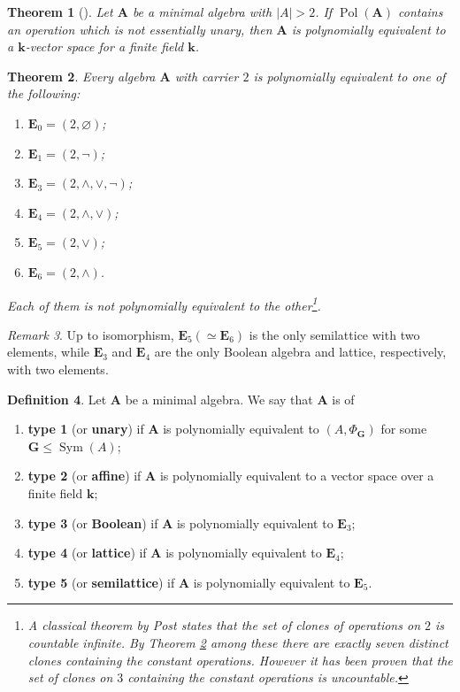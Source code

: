 \documentclass{amsart}
\theoremstyle{plain}
\newtheorem{theorem}{Theorem}[section]
\theoremstyle{definition}
\newtheorem{definition}[theorem]{Definition}
\theoremstyle{remark}
\newtheorem{remark}[theorem]{Remark}
\DeclareMathOperator{\Pol}{Pol}
\DeclareMathOperator{\Sym}{Sym}
\begin{document}
\begin{theorem}
    [\cite{classification-minimal}]
    Let $\mathbf{A}$ be a minimal algebra with $|A| > 2$.  
    If $\Pol(\mathbf{A})$ contains an operation which is not essentially unary, then $\mathbf{A}$ is polynomially equivalent to a $\mathbf{k}$-vector space for a finite field $\mathbf{k}$. 
\end{theorem}

\begin{theorem}
    \label{classification-two}
    Every algebra $\mathbf{A}$ with carrier $2$ is polynomially equivalent to one of the following: 
    \begin{enumerate}
        \item $\mathbf{E}_0= (2, \varnothing)$;
        \item $\mathbf{E}_1 = (2, \lnot)$; 
        \item $\mathbf{E}_3 = (2, \land, \lor, \lnot)$; 
        \item $\mathbf{E}_4 = (2, \land, \lor)$; 
        \item $\mathbf{E}_5 = (2, \lor)$; 
        \item $\mathbf{E}_6 = (2, \land)$.
    \end{enumerate}
    Each of them is not polynomially equivalent to the other\footnote{A classical theorem by Post states that the set of clones of operations on $2$ is countable infinite. 
    By Theorem \ref{classification-two} among these there are exactly seven distinct clones containing the constant operations.
    However it has been proven that the set of clones on $3$ containing the constant operations is uncountable.}.
\end{theorem}

\begin{remark}
    Up to isomorphism, $\mathbf{E}_5 (\simeq \mathbf{E}_6)$ is the only semilattice with two elements, while $\mathbf{E}_3$ and $\mathbf{E}_4$ are the only Boolean algebra and lattice, respectively, with two elements. 
\end{remark}

\begin{definition}
    Let $\mathbf{A}$ be a minimal algebra. 
    We say that $\mathbf{A}$ is of 
    \begin{enumerate}
        \item \textbf{type 1} (or \textbf{unary}) if $\mathbf{A}$ is polynomially equivalent to $(A, \Phi_\mathbf{G})$ for some $\mathbf{G} \le \Sym(A)$; 
        \item \textbf{type 2} (or \textbf{affine}) if $\mathbf{A}$ is polynomially equivalent to a vector space over a finite field $\mathbf{k}$; 
        \item \textbf{type 3} (or \textbf{Boolean}) if $\mathbf{A}$ is polynomially equivalent to $\mathbf{E}_3$;
        \item \textbf{type 4} (or \textbf{lattice}) if $\mathbf{A}$ is polynomially equivalent to $\mathbf{E}_4$;
        \item \textbf{type 5} (or \textbf{semilattice}) if $\mathbf{A}$ is polynomially equivalent to $\mathbf{E}_5$. 
    \end{enumerate}
\end{definition}
\end{document}

